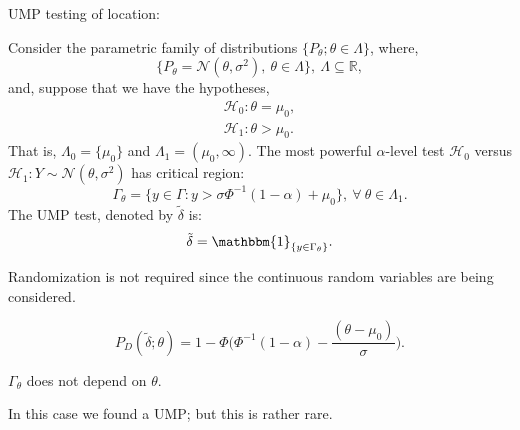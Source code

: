 \documentclass[a4paper,english,12pt]{article}
\begin{document}
\begin{exmp}{UMP testing of location:}
\par Consider the parametric family of distributions $\{P_\theta;\theta \in \Lambda\}$, where, 
\begin{equation}
\{P_\theta= \mathcal{N}(\theta,\sigma^2),~\theta \in \Lambda\}, ~ \Lambda \subseteq \mathbb{R},
\end{equation}
and, suppose that we have the hypotheses,
\begin{eqnarray}
\mathcal{H}_0 : \theta = \mu_0,\\
\mathcal{H}_1 : \theta > \mu_0.	
\end{eqnarray}
That is, $\Lambda_0 = \{\mu_0\}$ and $\Lambda_1 = (\mu_0,\infty)$. The most powerful $\alpha$-level test $\mathcal{H}_0$ versus $\mathcal{H}_1 : Y \sim \mathcal{N}(\theta,\sigma^2)$ has critical region:
\begin{equation*}
\Gamma_\theta = \{y \in \Gamma: y > \sigma \Phi^{-1}(1 - \alpha) + \mu_0 \}, ~ \forall ~ \theta \in \Lambda_1.
\end{equation*}
The UMP test, denoted by $\tilde{\delta}$ is:
\begin{equation*}
\tilde{\delta} = \mathbbm{1}_{\{y \in \Gamma_\theta\}}.
\end{equation*}
\begin{rem}
Randomization is not required since the continuous random variables are being considered.	
\end{rem}		
\begin{equation*}
P_D(\tilde{\delta}; \theta) = 1 - \Phi\Big(\Phi^{-1}(1 - \alpha) - \dfrac{(\theta - \mu_0)}{\sigma}\Big).
\end{equation*}
\begin{note}
	$\Gamma_\theta$ does not depend on $\theta$.	
\end{note}	
\begin{note}
	In this case we found a UMP; but this is rather rare.	
\end{note}	
\end{exmp}		 
\end{document}
